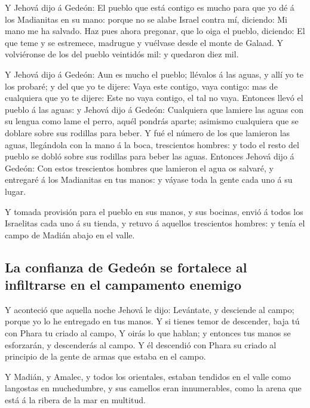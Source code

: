  Y Jehová dijo á Gedeón: El pueblo que está contigo es
mucho para que yo dé á los Madianitas en su mano: porque no se alabe
Israel contra mí, diciendo: Mi mano me ha salvado.  Haz
pues ahora pregonar, que lo oiga el pueblo, diciendo: El que teme y se
estremece, madrugue y vuélvase desde el monte de Galaad. Y volviéronse
de los del pueblo veintidós mil: y quedaron diez mil.

 Y Jehová dijo á Gedeón: Aun es mucho el pueblo; llévalos
á las aguas, y allí yo te los probaré; y del que yo te dijere: Vaya este
contigo, vaya contigo: mas de cualquiera que yo te dijere: Este no vaya
contigo, el tal no vaya.  Entonces llevó el pueblo á las
aguas: y Jehová dijo á Gedeón: Cualquiera que lamiere las aguas con su
lengua como lame el perro, aquél pondrás aparte; asimismo cualquiera que
se doblare sobre sus rodillas para beber.  Y fué el número
de los que lamieron las aguas, llegándola con la mano á la boca,
trescientos hombres: y todo el resto del pueblo se dobló sobre sus
rodillas para beber las aguas.  Entonces Jehová dijo á
Gedeón: Con estos trescientos hombres que lamieron el agua os salvaré, y
entregaré á los Madianitas en tus manos: y váyase toda la gente cada uno
á su lugar.

 Y tomada provisión para el pueblo en sus manos, y sus
bocinas, envió á todos los Israelitas cada uno á su tienda, y retuvo á
aquellos trescientos hombres: y tenía el campo de Madián abajo en el
valle.

\hypertarget{la-confianza-de-gedeuxf3n-se-fortalece-al-infiltrarse-en-el-campamento-enemigo}{%
\subsection{La confianza de Gedeón se fortalece al infiltrarse en el
campamento
enemigo}\label{la-confianza-de-gedeuxf3n-se-fortalece-al-infiltrarse-en-el-campamento-enemigo}}

 Y aconteció que aquella noche Jehová le dijo: Levántate,
y desciende al campo; porque yo lo he entregado en tus manos.
 Y si tienes temor de descender, baja tú con Phara tu
criado al campo,  Y oirás lo que hablan; y entonces tus
manos se esforzarán, y descenderás al campo. Y él descendió con Phara su
criado al principio de la gente de armas que estaba en el campo.

 Y Madián, y Amalec, y todos los orientales, estaban
tendidos en el valle como langostas en muchedumbre, y sus camellos eran
innumerables, como la arena que está á la ribera de la mar en multitud.

